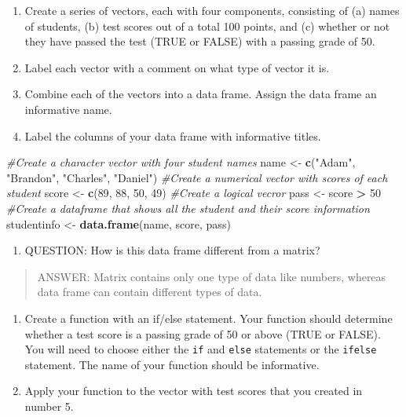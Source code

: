 \documentclass[]{article}
\newenvironment{Shaded}{\begin{snugshade}}{\end{snugshade}}
\newcommand{\KeywordTok}[1]{\textcolor[rgb]{0.13,0.29,0.53}{\textbf{#1}}}
\newcommand{\DecValTok}[1]{\textcolor[rgb]{0.00,0.00,0.81}{#1}}
\newcommand{\StringTok}[1]{\textcolor[rgb]{0.31,0.60,0.02}{#1}}
\newcommand{\CommentTok}[1]{\textcolor[rgb]{0.56,0.35,0.01}{\textit{#1}}}
\newcommand{\OperatorTok}[1]{\textcolor[rgb]{0.81,0.36,0.00}{\textbf{#1}}}
\newcommand{\NormalTok}[1]{#1}
\providecommand{\tightlist}{%
  \setlength{\itemsep}{0pt}\setlength{\parskip}{0pt}}
\begin{document}
\begin{enumerate}
\def\labelenumi{\arabic{enumi}.}
\setcounter{enumi}{4}
\item
  Create a series of vectors, each with four components, consisting of
  (a) names of students, (b) test scores out of a total 100 points, and
  (c) whether or not they have passed the test (TRUE or FALSE) with a
  passing grade of 50.
\item
  Label each vector with a comment on what type of vector it is.
\item
  Combine each of the vectors into a data frame. Assign the data frame
  an informative name.
\item
  Label the columns of your data frame with informative titles.
\end{enumerate}

\begin{Shaded}
\begin{Highlighting}[]
\CommentTok{#Create a character vector with four student names}
\NormalTok{name <-}\StringTok{ }\KeywordTok{c}\NormalTok{(}\StringTok{"Adam"}\NormalTok{, }\StringTok{"Brandon"}\NormalTok{, }\StringTok{"Charles"}\NormalTok{, }\StringTok{"Daniel"}\NormalTok{)}
\CommentTok{#Create a numerical vector with scores of each student}
\NormalTok{score <-}\StringTok{ }\KeywordTok{c}\NormalTok{(}\DecValTok{89}\NormalTok{, }\DecValTok{88}\NormalTok{, }\DecValTok{50}\NormalTok{, }\DecValTok{49}\NormalTok{)}
\CommentTok{#Create a logical vecror}
\NormalTok{pass <-}\StringTok{ }\NormalTok{score }\OperatorTok{>}\StringTok{ }\DecValTok{50}
\CommentTok{#Create a dataframe that shows all the student and their score information}
\NormalTok{studentinfo <-}\StringTok{ }\KeywordTok{data.frame}\NormalTok{(name, score, pass)}
\end{Highlighting}
\end{Shaded}

\begin{enumerate}
\def\labelenumi{\arabic{enumi}.}
\setcounter{enumi}{8}
\tightlist
\item
  QUESTION: How is this data frame different from a matrix?
\end{enumerate}

\begin{quote}
ANSWER: Matrix contains only one type of data like numbers, whereas data
frame can contain different types of data.
\end{quote}

\begin{enumerate}
\def\labelenumi{\arabic{enumi}.}
\setcounter{enumi}{9}
\item
  Create a function with an if/else statement. Your function should
  determine whether a test score is a passing grade of 50 or above (TRUE
  or FALSE). You will need to choose either the \texttt{if} and
  \texttt{else} statements or the \texttt{ifelse} statement. The name of
  your function should be informative.
\item
  Apply your function to the vector with test scores that you created in
  number 5.
\end{enumerate}
\end{document}
